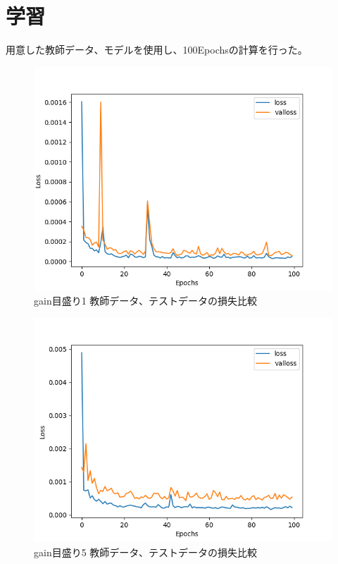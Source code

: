 \documentclass{jreport}		%
\begin{document}
\section{学習}
用意した教師データ、モデルを使用し、100Epochsの計算を行った。
\begin{figure}[htbp]
 \begin{center}
  \includegraphics[width=150mm]{gain1_loss_hikaku.png}
 \end{center}
 \caption{gain目盛り1 教師データ、テストデータの損失比較}
 \label{fig:one}
\end{figure}

\begin{figure}[htbp]
 \begin{center}
  \includegraphics[width=150mm]{gain5_loss_hikaku.png}
 \end{center}
 \caption{gain目盛り5 教師データ、テストデータの損失比較}
 \label{fig:one}
\end{figure}
\end{document}
